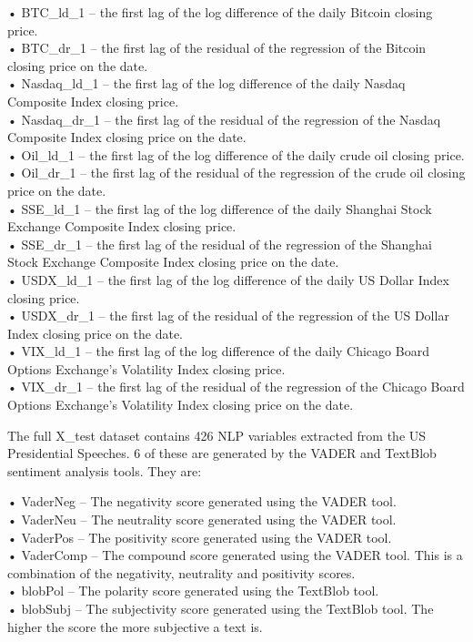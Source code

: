 \documentclass[11pt,preprint, authoryear]{elsarticle}
\numberwithin{equation}{section}
\numberwithin{figure}{section}
\numberwithin{table}{section}
\begin{document}
• BTC\_ld\_1 -- the first lag of the log difference of the daily Bitcoin
closing price.\\
• BTC\_dr\_1 -- the first lag of the residual of the regression of the
Bitcoin closing price on the date.\\
• Nasdaq\_ld\_1 -- the first lag of the log difference of the daily
Nasdaq Composite Index closing price.\\
• Nasdaq\_dr\_1 -- the first lag of the residual of the regression of
the Nasdaq Composite Index closing price on the date.\\
• Oil\_ld\_1 -- the first lag of the log difference of the daily crude
oil closing price.\\
• Oil\_dr\_1 -- the first lag of the residual of the regression of the
crude oil closing price on the date.\\
• SSE\_ld\_1 -- the first lag of the log difference of the daily
Shanghai Stock Exchange Composite Index closing price.\\
• SSE\_dr\_1 -- the first lag of the residual of the regression of the
Shanghai Stock Exchange Composite Index closing price on the date.\\
• USDX\_ld\_1 -- the first lag of the log difference of the daily US
Dollar Index closing price.\\
• USDX\_dr\_1 -- the first lag of the residual of the regression of the
US Dollar Index closing price on the date.\\
• VIX\_ld\_1 -- the first lag of the log difference of the daily Chicago
Board Options Exchange's Volatility Index closing price.\\
• VIX\_dr\_1 -- the first lag of the residual of the regression of the
Chicago Board Options Exchange's Volatility Index closing price on the
date.

The full X\_test dataset contains 426 NLP variables extracted from the
US Presidential Speeches. 6 of these are generated by the VADER and
TextBlob sentiment analysis tools. They are:

• VaderNeg -- The negativity score generated using the VADER tool.\\
• VaderNeu -- The neutrality score generated using the VADER tool.\\
• VaderPos -- The positivity score generated using the VADER tool.\\
• VaderComp -- The compound score generated using the VADER tool. This
is a combination of the negativity, neutrality and positivity scores.\\
• blobPol -- The polarity score generated using the TextBlob tool.\\
• blobSubj -- The subjectivity score generated using the TextBlob tool.
The higher the score the more subjective a text is.
\end{document}
